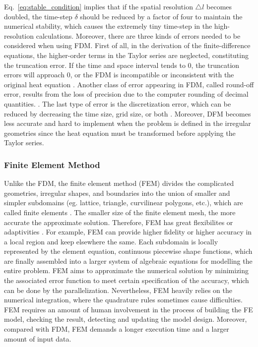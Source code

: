 Eq.~\ref{eq:stable_condition} implies that if the spatial resolution
$\triangle l$ becomes doubled, the time-step $\delta$ should be
reduced by a factor of four to maintain the numerical stability, which
causes the extremely tiny time-step in the high-resolution
calculations. Moreover, there are three kinds of errors needed to be
considered when using FDM. First of all, in the derivation of the
finite-difference equations, the higher-order terms in the Taylor
series are neglected, constituting the truncation error. If the time
and space interval tends to $0$, the truncation errors will approach
$0$, or the FDM is incompatible or inconsistent with the original heat
equation \cite{crank1979mathematics}. Another class of error appearing
in FDM, called round-off error, results from the loss of precision due
to the computer rounding of decimal
quantities. \cite{hoffman2018numerical}. The last type of error is the
discretization error, which can be reduced by decreasing the time
size, grid size, or both \cite{crank1979mathematics}. Moreover, DFM
becomes less accurate and hard to implement when the problem is
defined in the irregular geometries since the heat equation must be
transformed before applying the Taylor series.





\subsubsection{Finite Element Method}


Unlike the FDM, the finite element method
(FEM) \cite{zlamal1968finite} divides the complicated geometries,
irregular shapes, and boundaries into the union of smaller and simpler
subdomains (eg. lattice, triangle, curvilinear polygons, etc.), which
are called finite elements \cite{logan2011first}. The smaller size of
the finite element mesh, the more accurate the approximate
solution. Therefore, FEM has great flexibilites or
adaptivities \cite{reddy1993introduction}. For example, FEM can
provide higher fidelity or higher accuracy in a local region and keep
elsewhere the same. Each subdomain is locally represented by the
element equation, continuous piecewise shape functions, which are
finally assembled into a larger system of algebraic equations for
modelling the entire problem. FEM aims to approximate the numerical
solution by minimizing the associated error function to meet certain
specification of the accuracy, which can be done by the
parallelization. Nevertheless, FEM heavily relies on the numerical
integration, where the quadrature rules sometimes cause
difficulties. FEM requires an amount of human involvement in the
process of building the FE model, checking the result, detecting and
updating the model design. Moreover, compared with FDM, FEM demands a
longer execution time and a larger amount of input data.



